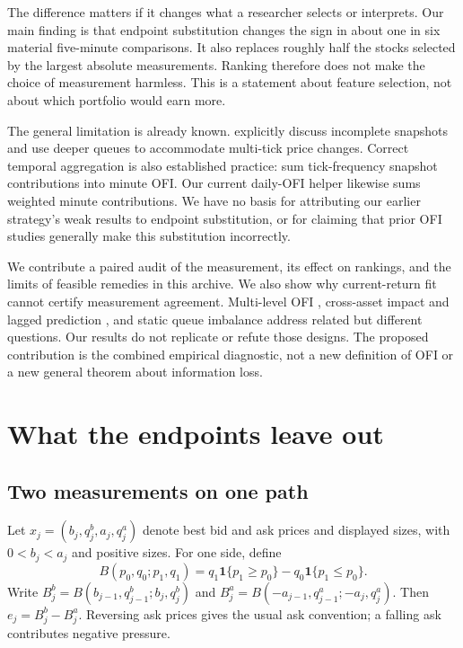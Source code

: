 \documentclass[11pt]{article}
\newcommand{\ind}{\mathbf{1}}
\begin{document}
The difference matters if it changes what a researcher selects or interprets. Our main finding is that endpoint substitution changes the sign in about one in six material five-minute comparisons. It also replaces roughly half the stocks selected by the largest absolute measurements. Ranking therefore does not make the choice of measurement harmless. This is a statement about feature selection, not about which portfolio would earn more.

The general limitation is already known. \citet{su} explicitly discuss incomplete snapshots and use deeper queues to accommodate multi-tick price changes. Correct temporal aggregation is also established practice: \citet{ghysels} sum tick-frequency snapshot contributions into minute OFI. Our current daily-OFI helper likewise sums weighted minute contributions. We have no basis for attributing our earlier strategy's weak results to endpoint substitution, or for claiming that prior OFI studies generally make this substitution incorrectly.

We contribute a paired audit of the measurement, its effect on rankings, and the limits of feasible remedies in this archive. We also show why current-return fit cannot certify measurement agreement. Multi-level OFI \citep{xu}, cross-asset impact and lagged prediction \citep{ccz}, and static queue imbalance \citep{gould} address related but different questions. Our results do not replicate or refute those designs. The proposed contribution is the combined empirical diagnostic, not a new definition of OFI or a new general theorem about information loss.

\section{What the endpoints leave out}
\subsection{Two measurements on one path}
Let $x_j=(b_j,q^b_j,a_j,q^a_j)$ denote best bid and ask prices and displayed sizes, with $0<b_j<a_j$ and positive sizes. For one side, define
\begin{equation}
 B(p_0,q_0;p_1,q_1)=q_1\ind\{p_1\geq p_0\}-q_0\ind\{p_1\leq p_0\}.
 \label{eq:B}
\end{equation}
Write $B^b_j=B(b_{j-1},q^b_{j-1};b_j,q^b_j)$ and $B^a_j=B(-a_{j-1},q^a_{j-1};-a_j,q^a_j)$. Then $e_j=B^b_j-B^a_j$. Reversing ask prices gives the usual ask convention; a falling ask contributes negative pressure.
\end{document}
